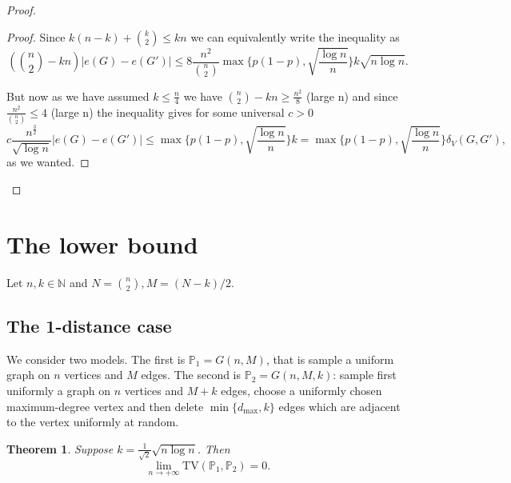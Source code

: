 \documentclass[12pt,a4paper]{article}
\newtheorem{theorem}{Theorem}[section]
\numberwithin{equation}{section}
\numberwithin{equation}{section}
\newcommand{\1}{{\text{\Large $\mathfrak 1$}}}
\newcommand{\2}[1]{{\text{\Large $\mathfrak 1$}\!\left(#1\right)}}
\begin{document}
\begin{proof}
\begin{proof}
Since  $ k(n-k)+\binom{k}{2} \leq kn$ we can equivalently write the inequality as
$$\left( \binom{n}{2}-kn \right)|e(G)-e(G')| \leq 8 \frac{n^2}{\binom{n}{2}} \max\{p(1-p),\sqrt{\frac{\log n}{n}}\} k  \sqrt{n \log n}.$$

But now as we have assumed $k \leq \frac{n}{4}$ we have $\binom{n}{2}-kn \geq \frac{n^2}{8}$ (large n) and since $\frac{n^2}{\binom{n}{2}} \leq 4$ (large n) the inequality gives 
for some universal $c>0$
$$c\frac{n^{\frac{3}{2}}}{\sqrt{\log n}}|e(G)-e(G')| \leq  \max\{p(1-p),\sqrt{\frac{\log n}{n}}\} k  =\max\{p(1-p),\sqrt{\frac{\log n}{n}}\} \delta_V(G,G'),$$
as we wanted.


\end{proof}




\end{proof}


\section{The lower bound}
Let $n,k \in \mathbb{N}$ and $N=\binom{n}{2},M=(N-k)/2$.

\subsection{The 1-distance case}
We consider two models. The first is $\mathbb{P}_1=G(n,M)$, that is sample a uniform graph on $n$ vertices and $M$ edges. The second is $\mathbb{P}_2=G(n,M,k)$: sample first uniformly a graph on $n$ vertices and $M+k$ edges, choose a uniformly chosen maximum-degree vertex and then delete $\min\{ d_{\mathrm{max}},k\}$ edges which are adjacent to the vertex uniformly at random. 


\begin{theorem}
Suppose $k=\frac{1}{\sqrt{2}}\sqrt{n \log n}$. Then $$ \lim_{n \rightarrow +\infty} \mathrm{TV}\left(\mathbb{P}_1,\mathbb{P}_2\right) = 0.$$
\end{theorem}
\end{document}
